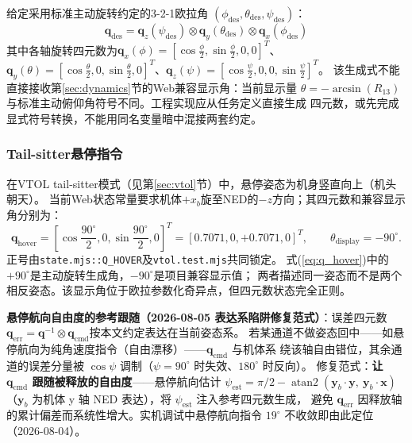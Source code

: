 给定采用标准主动旋转约定的3-2-1欧拉角
$(\phi_{\text{des}}, \theta_{\text{des}}, \psi_{\text{des}})$：
\begin{equation}
    \mathbf{q}_{\text{des}} = \mathbf{q}_z(\psi_{\text{des}}) \otimes \mathbf{q}_y(\theta_{\text{des}}) \otimes \mathbf{q}_x(\phi_{\text{des}})
    \label{eq:q_from_euler}
\end{equation}
其中各轴旋转四元数为$\mathbf{q}_x(\phi)=[\cos\frac{\phi}{2}, \sin\frac{\phi}{2}, 0, 0]^T$、$\mathbf{q}_y(\theta)=[\cos\frac{\theta}{2}, 0, \sin\frac{\theta}{2}, 0]^T$、$\mathbf{q}_z(\psi)=[\cos\frac{\psi}{2}, 0, 0, \sin\frac{\psi}{2}]^T$。
该生成式不能直接接收第\ref{sec:dynamics}节的Web兼容显示角：当前显示量
$\theta=-\arcsin(R_{13})$与标准主动俯仰角符号不同。工程实现应从任务定义直接生成
四元数，或先完成显式符号转换，不能用同名变量暗中混接两套约定。

\subsubsection{Tail-sitter悬停指令}

在VTOL tail-sitter模式（见第\ref{sec:vtol}节）中，悬停姿态为机身竖直向上（机头朝天）。
当前Web状态常量要求机体$+x_b$旋至NED的$-z$方向；其四元数和兼容显示角分别为：
\begin{equation}
    \mathbf{q}_{\text{hover}}
    = \left[\cos\frac{90^\circ}{2}, 0, \sin\frac{90^\circ}{2}, 0\right]^T
    = [0.7071, 0, +0.7071, 0]^T,\qquad \theta_{\text{display}}=-90^\circ .
    \label{eq:q_hover}
\end{equation}
正号由\texttt{state.mjs::Q\_HOVER}及\texttt{vtol.test.mjs}共同锁定。
式(\ref{eq:q_hover})中的$+90^\circ$是主动旋转生成角，$-90^\circ$是项目兼容显示值；
两者描述同一姿态而不是两个相反姿态。该显示角位于欧拉参数化奇异点，但四元数状态完全正则。

\textbf{悬停航向自由度的参考跟随（2026-08-05 表达系陷阱修复范式）}：误差四元数
$\mathbf q_{\text{err}}=\mathbf q^{-1}\otimes\mathbf q_{\text{cmd}}$按本文约定表达在当前姿态系。
若某通道不做姿态回中——如悬停航向为纯角速度指令（自由漂移）——$\mathbf{q}_{\text{cmd}}$ 与机体系
绕该轴自由错位，其余通道的误差分量被 $\cos\psi$ 调制（$\psi=90^\circ$ 时失效、$180^\circ$ 时反向）。
修复范式：\textbf{让 $\mathbf{q}_{\text{cmd}}$ 跟随被释放的自由度}——悬停航向估计
$\psi_{\text{est}} = \pi/2 - \operatorname{atan2}(\mathbf{y}_b\cdot\mathbf{y},\ \mathbf{y}_b\cdot\mathbf{x})$
（$\mathbf{y}_b$ 为机体 y 轴 NED 表达），将 $\psi_{\text{est}}$ 注入参考四元数生成，
避免 $\mathbf{q}_{\text{err}}$ 因释放轴的累计偏差而系统性增大。实机调试中悬停航向指令
$19^\circ$ 不收敛即由此定位（2026-08-04）。

